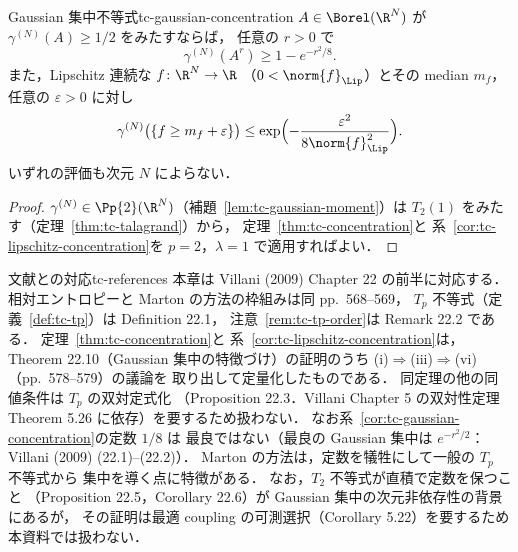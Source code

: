 \begin{corollary}{Gaussian 集中不等式}{tc-gaussian-concentration}
  $A\in\Borel(\R^N)$ が $\gamma^{(N)}(A)\geq1/2$ をみたすならば，
  任意の $r>0$ で
  \[
    \gamma^{(N)}(A^r)\geq1-e^{-r^2/8}.
  \]
  また，Lipschitz 連続な $f\colon\R^N\to\R$
  （$0<\norm{f}_{\Lip}$）とその median $m_f$，
  任意の $\varepsilon>0$ に対し
  \[
    \gamma^{(N)}\bigl(\{f\geq m_f+\varepsilon\}\bigr)
    \leq\exp\Bigl(-\frac{\varepsilon^2}{8\norm{f}_{\Lip}^2}\Bigr).
  \]
  いずれの評価も次元 $N$ によらない．
\end{corollary}

\begin{proof}
  $\gamma^{(N)}\in\Pp{2}(\R^N)$（補題~\ref{lem:tc-gaussian-moment}）は
  $T_2(1)$ をみたす（定理~\ref{thm:tc-talagrand}）から，
  定理~\ref{thm:tc-concentration}と
  系~\ref{cor:tc-lipschitz-concentration}を
  $p=2$，$\lambda=1$ で適用すればよい．
\end{proof}

\begin{remark}{文献との対応}{tc-references}
  本章は Villani (2009) Chapter 22 の前半に対応する．
  相対エントロピーと Marton の方法の枠組みは同 pp.~568--569，
  $T_p$ 不等式（定義~\ref{def:tc-tp}）は Definition 22.1，
  注意~\ref{rem:tc-tp-order}は Remark 22.2 である．
  定理~\ref{thm:tc-concentration}と
  系~\ref{cor:tc-lipschitz-concentration}は，
  Theorem 22.10（Gaussian 集中の特徴づけ）の証明のうち
  (i)$\Rightarrow$(iii)$\Rightarrow$(vi)（pp.~578--579）の議論を
  取り出して定量化したものである．
  同定理の他の同値条件は $T_p$ の双対定式化
  （Proposition 22.3．Villani Chapter 5 の双対性定理
  Theorem 5.26 に依存）を要するため扱わない．
  なお系~\ref{cor:tc-gaussian-concentration}の定数 $1/8$ は
  最良ではない（最良の Gaussian 集中は $e^{-r^2/2}$：
  Villani (2009) (22.1)--(22.2)）．
  Marton の方法は，定数を犠牲にして一般の $T_p$ 不等式から
  集中を導く点に特徴がある．
  なお，$T_2$ 不等式が直積で定数を保つこと
  （Proposition 22.5，Corollary 22.6）が
  Gaussian 集中の次元非依存性の背景にあるが，
  その証明は最適 coupling の可測選択（Corollary 5.22）を要するため
  本資料では扱わない．
\end{remark}
